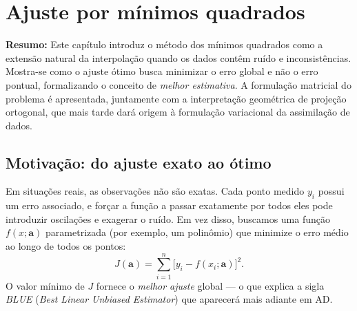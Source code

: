 \chapter{Ajuste por mínimos quadrados}
\label{ch:minimos-quadrados}

\noindent\textbf{Resumo:}
Este capítulo introduz o método dos mínimos quadrados como a extensão natural da interpolação quando os dados contêm ruído e inconsistências.  
Mostra-se como o ajuste ótimo busca minimizar o erro global e não o erro pontual, formalizando o conceito de \emph{melhor estimativa}.  
A formulação matricial do problema é apresentada, juntamente com a interpretação geométrica de projeção ortogonal, que mais tarde dará origem à formulação variacional da assimilação de dados.

\section{Motivação: do ajuste exato ao ótimo}
Em situações reais, as observações não são exatas. Cada ponto medido $y_i$ possui um erro associado, e forçar a função a passar exatamente por todos eles pode introduzir oscilações e exagerar o ruído.  
Em vez disso, buscamos uma função $f(x; \mathbf{a})$ parametrizada (por exemplo, um polinômio) que minimize o erro médio ao longo de todos os pontos:
\begin{equation}
J(\mathbf{a}) = \sum_{i=1}^{n} \big[y_i - f(x_i; \mathbf{a})\big]^2.
\label{eq:J_scalar}
\end{equation}
O valor mínimo de $J$ fornece o \emph{melhor ajuste} global — o que explica a sigla \emph{BLUE} (\emph{Best Linear Unbiased Estimator}) que aparecerá mais adiante em AD.

